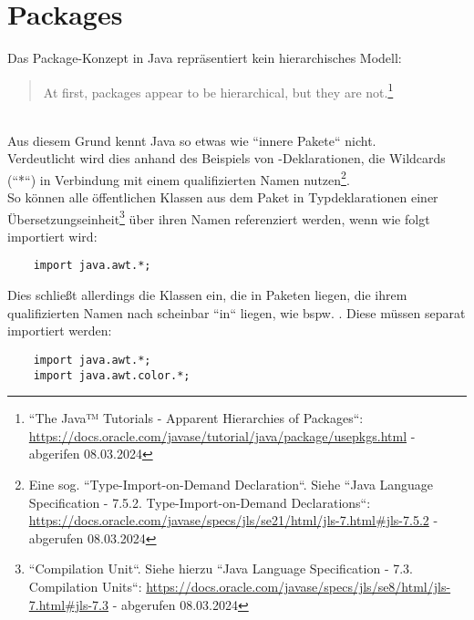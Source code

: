 \section{Packages}
Das Package-Konzept in Java repräsentiert kein hierarchisches Modell:\blockquote{
    At first, packages appear to be hierarchical, but they are not.\footnote{
        ``The Java™ Tutorials - Apparent Hierarchies of Packages``: \url{https://docs.oracle.com/javase/tutorial/java/package/usepkgs.html} - abgerifen 08.03.2024
    }
}\\
Aus diesem Grund kennt Java so etwas wie ``innere Pakete`` nicht.\\

\noindent
Verdeutlicht wird dies anhand des Beispiels von -Deklarationen, die Wildcards (``*``) in Verbindung mit einem qualifizierten Namen nutzen\footnote{
    Eine sog. ``Type-Import-on-Demand Declaration``. Siehe  ``Java Language Specification - 7.5.2. Type-Import-on-Demand Declarations``: \url{https://docs.oracle.com/javase/specs/jls/se21/html/jls-7.html#jls-7.5.2} - abgerufen 08.03.2024
}.\\
So können alle öffentlichen Klassen aus dem Paket  in Typdeklarationen einer Übersetzungseinheit\footnote{
    ``Compilation Unit``. Siehe hierzu ``Java Language Specification - 7.3. Compilation Units``: \url{https://docs.oracle.com/javase/specs/jls/se8/html/jls-7.html#jls-7.3} - abgerufen 08.03.2024
} über ihren Namen referenziert werden, wenn wie folgt importiert wird:

\begin{verbatim}
    import java.awt.*;
\end{verbatim}

\noindent
Dies schließt allerdings  die Klassen ein, die in Paketen liegen, die ihrem qualifizierten Namen nach scheinbar ``in``  liegen,
wie bspw. .
Diese müssen separat importiert werden:

\begin{verbatim}
    import java.awt.*;
    import java.awt.color.*;
\end{verbatim}